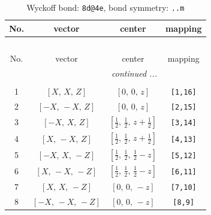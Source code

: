 \documentclass[fleqn,8pt]{jsarticle}
\begin{document}
\begin{longtable}{cccc}
\caption{Wyckoff bond: {\tt 8d@4e}, bond symmetry: {\tt ..m}}
 \\
 \hline \hline
No. & vector & center & mapping \\ \hline \endfirsthead

\multicolumn{3}{l}{\tablename\ \thetable{}} \\
 \hline \hline
No. & vector & center & mapping \\ \hline \endhead

 \hline \hline
\multicolumn{3}{r}{\footnotesize\it continued ...} \\ \endfoot

 \hline \hline
\multicolumn{3}{r}{} \\ \endlastfoot

1 & $\left[ X,\, X,\, Z \right]$ & $\left[ 0,\, 0,\, z \right]$ & {\tt [1,16]} \\ \hline
2 & $\left[ - X,\, - X,\, Z \right]$ & $\left[ 0,\, 0,\, z \right]$ & {\tt [2,15]} \\ \hline
3 & $\left[ - X,\, X,\, Z \right]$ & $\left[ \frac{1}{2},\, \frac{1}{2},\, z + \frac{1}{2} \right]$ & {\tt [3,14]} \\ \hline
4 & $\left[ X,\, - X,\, Z \right]$ & $\left[ \frac{1}{2},\, \frac{1}{2},\, z + \frac{1}{2} \right]$ & {\tt [4,13]} \\ \hline
5 & $\left[ - X,\, X,\, - Z \right]$ & $\left[ \frac{1}{2},\, \frac{1}{2},\, \frac{1}{2} - z \right]$ & {\tt [5,12]} \\ \hline
6 & $\left[ X,\, - X,\, - Z \right]$ & $\left[ \frac{1}{2},\, \frac{1}{2},\, \frac{1}{2} - z \right]$ & {\tt [6,11]} \\ \hline
7 & $\left[ X,\, X,\, - Z \right]$ & $\left[ 0,\, 0,\, - z \right]$ & {\tt [7,10]} \\ \hline
8 & $\left[ - X,\, - X,\, - Z \right]$ & $\left[ 0,\, 0,\, - z \right]$ & {\tt [8,9]} \\
\end{longtable}
\renewcommand{\arraystretch}{1.2}
\end{document}
